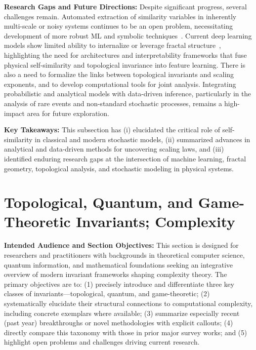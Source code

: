 \documentclass[sigconf]{acmart}
\begin{document}
\vspace{1em}

\textbf{Research Gaps and Future Directions:} Despite significant progress, several challenges remain. Automated extraction of similarity variables in inherently multi-scale or noisy systems continues to be an open problem, necessitating development of more robust ML and symbolic techniques~\cite{ref65}. Current deep learning models show limited ability to internalize or leverage fractal structure~\cite{ref39}, highlighting the need for architectures and interpretability frameworks that fuse physical self-similarity and topological invariance into feature learning. There is also a need to formalize the links between topological invariants and scaling exponents, and to develop computational tools for joint analysis. Integrating probabilistic and analytical models with data-driven inference, particularly in the analysis of rare events and non-standard stochastic processes, remains a high-impact area for future exploration.

\textbf{Key Takeaways:} This subsection has (i) elucidated the critical role of self-similarity in classical and modern stochastic models, (ii) summarized advances in analytical and data-driven methods for uncovering scaling laws, and (iii) identified enduring research gaps at the intersection of machine learning, fractal geometry, topological analysis, and stochastic modeling in physical systems.

\section{Topological, Quantum, and Game-Theoretic Invariants; Complexity}

\textbf{Intended Audience and Section Objectives:} This section is designed for researchers and practitioners with backgrounds in theoretical computer science, quantum information, and mathematical foundations seeking an integrative overview of modern invariant frameworks shaping complexity theory. The primary objectives are to: (1) precisely introduce and differentiate three key classes of invariants—topological, quantum, and game-theoretic; (2) systematically elucidate their structural connections to computational complexity, including concrete exemplars where available; (3) summarize especially recent (past year) breakthroughs or novel methodologies with explicit callouts; (4) directly compare this taxonomy with those in prior major survey works; and (5) highlight open problems and challenges driving current research.
\end{document}

